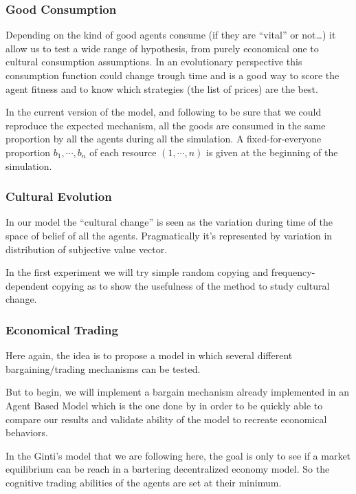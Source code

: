 \documentclass{wscpaperproc}
\begin{document}
\subsubsection{Good Consumption}\label{consumption}
Depending on the kind of good agents consume (if they are ``vital'' or not\ldots) it allow us to test a wide range of hypothesis, from purely economical one to cultural consumption assumptions.  In an evolutionary perspective this consumption function could change trough time and is a good way to score the agent fitness and to know which strategies (the list of prices) are the best.

In the current version of the model, and following
\cite{gintis_emergence_2006} to be sure that we could reproduce the expected mechanism, all the goods are consumed in the same proportion by all the agents during all the simulation. A fixed-for-everyone proportion $b_1,\cdots,b_n$ of each resource $(1, \cdots, n)$ is given at the beginning of the simulation.

\subsubsection{Cultural Evolution}
In our model the ``cultural change'' is seen as the variation during time of the space of belief of all the agents. Pragmatically it's represented by variation in distribution of subjective value vector.

In the first experiment we will try simple random copying and frequency-dependent copying as \cite{mesoudi_random_2009} to show the usefulness of the method to study cultural change. 


\subsubsection{Economical Trading}\label{trade}
Here again, the idea is to propose a model in which several different bargaining/trading mechanisms can be tested. 

But to begin, we will implement a bargain mechanism already implemented in an Agent Based Model which is the one done by
\cite{gintis_emergence_2006} in order to be quickly able to compare our results and validate ability of the model to recreate economical behaviors. 

In the Ginti's model that we are following here, the goal is only to see if a market equilibrium can be reach in a bartering decentralized economy model. So the cognitive trading abilities of the agents are set at their minimum. 
\end{document}
